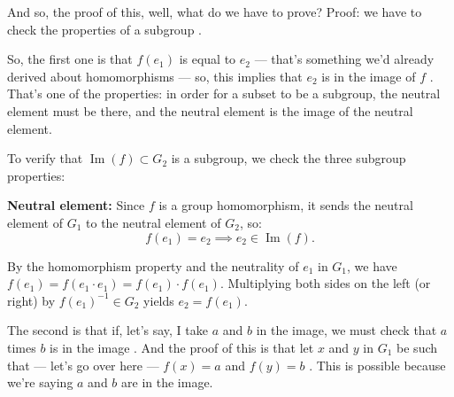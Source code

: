 \begin{proofWrapper}

\begin{speech}[00:01:42 - 00:02:19]
And so, the proof of this, well, what do we have to prove? Proof: we have to check the properties of a subgroup .

So, the first one is that $f(e_1)$ is equal to $e_2$  --- that's something we'd already derived about homomorphisms --- so, this implies that $e_2$ is in the image of $f$ . That's one of the properties: in order for a subset to be a subgroup, the neutral element must be there, and the neutral element is the image of the neutral element.
\end{speech}

\begin{content}
To verify that $\operatorname{Im}(f) \subset G_2$ is a subgroup, we check the three subgroup properties:

\textbf{Neutral element:} Since $f$ is a group homomorphism, it sends the neutral element of $G_1$ to the neutral element of $G_2$, so:
\[
f(e_1) = e_2 \implies e_2 \in \operatorname{Im}(f).
\]

\begin{steps}[Why \texorpdfstring{$f(e_1) = e_2$}{f(e\_1) = e\_2} Holds]
By the homomorphism property and the neutrality of $e_1$ in $G_1$, we have $f(e_1) = f(e_1 \cdot e_1) = f(e_1) \cdot f(e_1)$. Multiplying both sides on the left (or right) by $f(e_1)^{-1} \in G_2$ yields $e_2 = f(e_1)$.
\end{steps}
\end{content}

\begin{speech}[00:02:19 - 00:03:27]
The second is that if, let's say, I take $a$ and $b$ in the image, we must check that $a$ times $b$ is in the image . And the proof of this is that let $x$ and $y$ in $G_1$ be such that --- let's go over here  --- $f(x) = a$ and $f(y) = b$ . This is possible because we're saying $a$ and $b$ are in the image.


\end{speech}
\end{proofWrapper}
